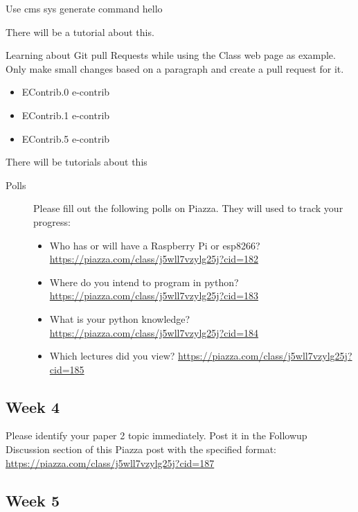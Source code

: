 Use cms sys generate command hello

There will be a tutorial about this.

Learning about Git pull Requests while using the Class web page as
example. Only make small changes based on a paragraph and create a pull
request for it.

\begin{itemize}
\tightlist
\item
  EContrib.0 e-contrib
\item
  EContrib.1 e-contrib
\item
  EContrib.5 e-contrib
\end{itemize}

There will be tutorials about this

\begin{description}
\item[Polls]
Please fill out the following polls on Piazza. They will used to track
your progress:

\begin{itemize}
\tightlist
\item
  Who has or will have a Raspberry Pi or esp8266?
  \url{https://piazza.com/class/j5wll7vzylg25j?cid=182}
\item
  Where do you intend to program in python?
  \url{https://piazza.com/class/j5wll7vzylg25j?cid=183}
\item
  What is your python knowledge?
  \url{https://piazza.com/class/j5wll7vzylg25j?cid=184}
\item
  Which lectures did you view?
  \url{https://piazza.com/class/j5wll7vzylg25j?cid=185}
\end{itemize}
\end{description}

\subsection{Week 4}\label{week-4}

Please identify your paper 2 topic immediately. Post it in the Followup
Discussion section of this Piazza post with the specified format:
\url{https://piazza.com/class/j5wll7vzylg25j?cid=187}

\subsection{Week 5}\label{week-5}

